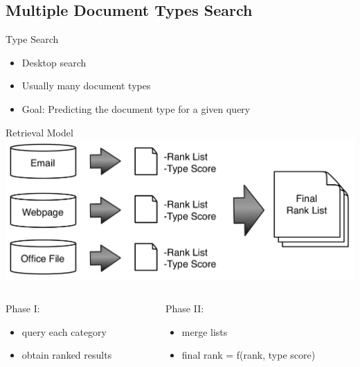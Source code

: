 \subsection{Multiple Document Types Search}

\begin{frame}{Type Search}
  \begin{itemize}
    \item Desktop search
    \item Usually many document types
    \item Goal: Predicting the document type for a given query
  \end{itemize}
\end{frame}

\begin{frame}{Retrieval Model}
  \includegraphics[width=\textwidth]{img/typeSearch.png}
  \begin{columns}
  \begin{column}[l]{0.5\textwidth}
  \begin{center}
  Phase I:\\
  \begin{itemize}
  \item query each category
  \item obtain ranked results
  \end{itemize}
  \end{center}
  \end{column}
  \begin{column}[c]{0.5\textwidth}
  \begin{center}
  Phase II: \\
  \begin{itemize}
  \item merge lists
  \item \small{final rank = f(rank, type score)}
  \end{itemize}
  \end{center}
  \end{column}
  \end{columns}

\end{frame}

